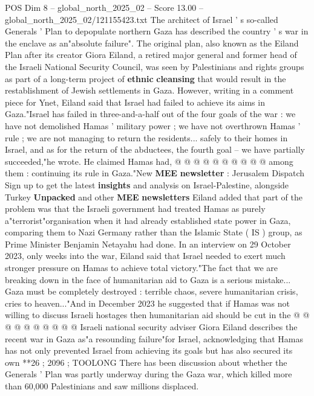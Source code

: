 \begin{textsample}{POS Dim 8 – global\_north\_2025\_02 – Score 13.00 – global\_north\_2025\_02/121155423.txt}  \label{ex:f8_pos_014}
The architect of Israel ' s so-called Generals ' Plan to depopulate northern Gaza has described the country ' s war in the enclave as an"absolute failure".
The original plan, also known as the Eiland Plan after its creator Giora Eiland, a retired major general and former head of the Israeli National Security Council, was seen by Palestinians and rights groups as part of a long-term project of \textbf{ethnic} \textbf{cleansing} that would result in the restablishment of Jewish settlements in Gaza.
However, writing in a comment piece for Ynet, Eiland said that Israel had failed to achieve its aims in Gaza."Israel has failed in three-and-a-half out of the four goals of the war : we have not demolished Hamas ' military power ; we have not overthrown Hamas ' rule ; we are not managing to return the residents... safely to their homes in Israel, and as for the return of the abductees, the fourth goal -- we have partially succeeded,"he wrote.
He claimed Hamas had, @ @ @ @ @ @ @ @ @ @ among them : continuing its rule in Gaza."New \textbf{MEE} \textbf{newsletter} : Jerusalem Dispatch Sign up to get the latest \textbf{insights} and analysis on Israel-Palestine, alongside Turkey \textbf{Unpacked} and other \textbf{MEE} \textbf{newsletters} Eiland added that part of the problem was that the Israeli government had treated Hamas as purely a"terrorist"organisation when it had already established state power in Gaza, comparing them to Nazi Germany rather than the Islamic State ( IS ) group, as Prime Minister Benjamin Netayahu had done.
In an interview on 29 October 2023, only weeks into the war, Eiland said that Israel needed to exert much stronger pressure on Hamas to achieve total victory."The fact that we are breaking down in the face of humanitarian aid to Gaza is a serious mistake...
Gaza must be completely destroyed : terrible chaos, severe humanitarian crisis, cries to heaven..."And in December 2023 he suggested that if Hamas was not willing to discuss Israeli hostages then humanitarian aid should be cut in the @ @ @ @ @ @ @ @ @ @ Israeli national security adviser Giora Eiland describes the recent war in Gaza as"a resounding failure"for Israel, acknowledging that Hamas has not only prevented Israel from achieving its goals but has also secured its own **26 ; 2096 ; TOOLONG There has been discussion about whether the Generals ' Plan was partly underway during the Gaza war, which killed more than 60,000 Palestinians and saw millions displaced.

\end{textsample}
